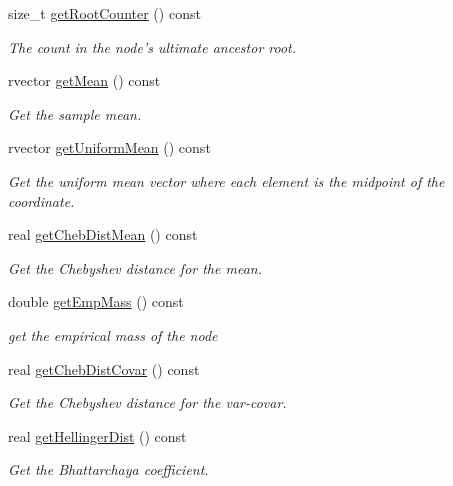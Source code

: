 \begin{DoxyCompactItemize}
size\-\_\-t \hyperlink{classsubpavings_1_1SPSnode_aeac2247b4626b1adfa609d3ff109ceb2}{get\-Root\-Counter} () const 
\begin{DoxyCompactList}\small\item\em \-The count in the node's ultimate ancestor root. \end{DoxyCompactList}\item 
rvector \hyperlink{classsubpavings_1_1SPSnode_aa5ae31017fb2fdee8b9168009d8d08a6}{get\-Mean} () const 
\begin{DoxyCompactList}\small\item\em \-Get the sample mean. \end{DoxyCompactList}\item 
rvector \hyperlink{classsubpavings_1_1SPSnode_a4369d3887385551e053d3873b600f8a1}{get\-Uniform\-Mean} () const 
\begin{DoxyCompactList}\small\item\em \-Get the uniform mean vector where each element is the midpoint of the coordinate. \end{DoxyCompactList}\item 
real \hyperlink{classsubpavings_1_1SPSnode_aa3a4a9df979f04453e82d76866b52850}{get\-Cheb\-Dist\-Mean} () const 
\begin{DoxyCompactList}\small\item\em \-Get the \-Chebyshev distance for the mean. \end{DoxyCompactList}\item 
double \hyperlink{classsubpavings_1_1SPSnode_a31ee93bb53be29fd0e50ff7fcd189c98}{get\-Emp\-Mass} () const 
\begin{DoxyCompactList}\small\item\em get the empirical mass of the node \end{DoxyCompactList}\item 
real \hyperlink{classsubpavings_1_1SPSnode_a7713822499beb30a3d30f43b79c608b8}{get\-Cheb\-Dist\-Covar} () const 
\begin{DoxyCompactList}\small\item\em \-Get the \-Chebyshev distance for the var-\/covar. \end{DoxyCompactList}\item 
real \hyperlink{classsubpavings_1_1SPSnode_aa0ea6455e40f7f2bdb1e972ab080f5a5}{get\-Hellinger\-Dist} () const 
\begin{DoxyCompactList}\small\item\em \-Get the \-Bhattarchaya coefficient. \end{DoxyCompactList}\item 

\end{DoxyCompactItemize}
